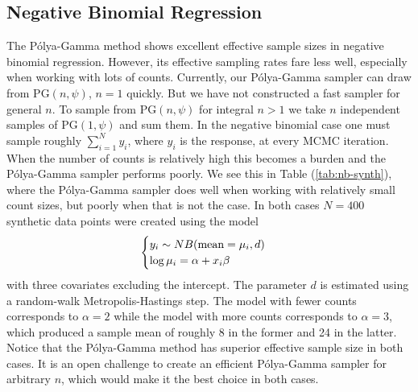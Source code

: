 \documentclass[11pt]{article}
\newcommand{\Polya}{P\'{o}lya}
\newcommand{\PG}{\text{PG}}
\begin{document}
\subsection{Negative Binomial Regression}

The \Polya-Gamma method shows excellent effective sample sizes in negative
binomial regression.  However, its effective sampling rates fare less well,
especially when working with lots of counts.  Currently, our \Polya-Gamma
sampler can draw from $\PG(n, \psi)$, $n=1$ quickly.  But we have not
constructed a fast sampler for general $n$.  To sample from $\PG(n, \psi)$ for
integral $n > 1$ we take $n$ independent samples of $\PG(1, \psi)$ and sum them.
In the negative binomial case one must sample roughly $\sum_{i=1}^N y_i$, where
$y_i$ is the response, at every MCMC iteration.  When the number of counts is
relatively high this becomes a burden and the \Polya-Gamma sampler performs
poorly.  We see this in Table (\ref{tab:nb-synth}), where the \Polya-Gamma
sampler does well when working with relatively small count sizes, but poorly
when that is not the case.  In both cases $N=400$ synthetic data points were
created using the model
\[
\begin{cases}
y_i \sim NB(\textmd{mean}=\mu_i, d) \\
\log \mu_i = \alpha + x_i \beta
\end{cases}
\]
with three covariates excluding the intercept.  The parameter $d$ is estimated
using a random-walk Metropolis-Hastings step.  The model with fewer counts
corresponds to $\alpha = 2$ while the model with more counts corresponds to
$\alpha = 3$, which produced a sample mean of roughly 8 in the former and 24 in
the latter.  Notice that the \Polya-Gamma method has superior effective sample
size in both cases.  It is an open challenge to create an efficient \Polya-Gamma
sampler for arbitrary $n$, which would make it the best choice in both cases.
\end{document}
